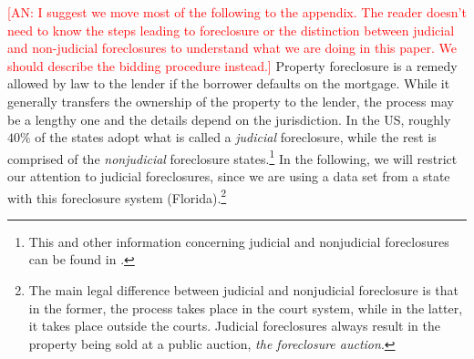 \documentclass[11pt,twopage]{article}
\newcommand{\AN}[1]{\textcolor{red}{[AN: #1]}}
\begin{document}
\AN{I suggest we move most of the following to the appendix. The reader doesn't
need to know the steps leading to foreclosure or the distinction between
judicial and non-judicial foreclosures to understand what we are doing in this
paper. We should describe the bidding procedure instead.}
Property foreclosure is a remedy allowed by law to the lender if the
borrower defaults on the mortgage. While it generally transfers the
ownership of the property to the lender, the process may be a lengthy
one and the details depend on the jurisdiction. In the US, roughly
$40\%$ of the states adopt what is called a \emph{judicial}
foreclosure, while the rest is comprised of the \emph{nonjudicial}
foreclosure states.\footnote{This and
 other information concerning judicial and nonjudicial foreclosures
 can be found in \cite{nelson2004reforming}.} In the following, we will
 restrict our attention to judicial foreclosures, since we are using a
 data set from a state with this foreclosure system (Florida).\footnote{
The main legal difference between judicial and nonjudicial foreclosure
is that in the former, the process takes place in the court system,
while in the latter, it takes place outside the courts. Judicial
foreclosures always result in the property being sold at a public
auction, \emph{the foreclosure auction}. 
}
\end{document}
